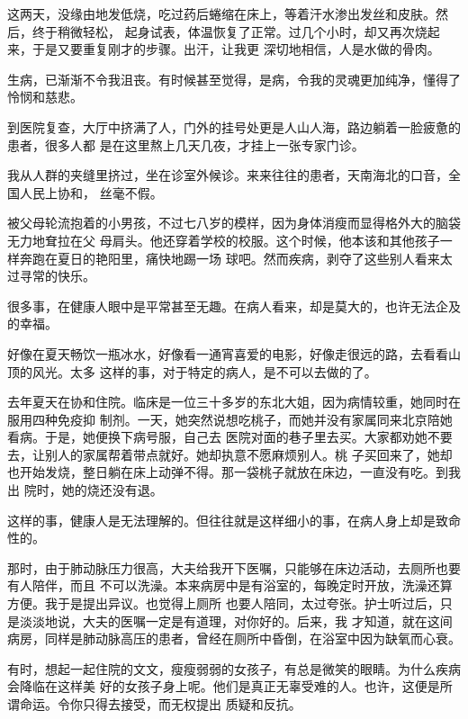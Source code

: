 		这两天，没缘由地发低烧，吃过药后蜷缩在床上，等着汗水渗出发丝和皮肤。然后，终于稍微轻松，
	起身试表，体温恢复了正常。过几个小时，却又再次烧起来，于是又要重复刚才的步骤。出汗，让我更
	深切地相信，人是水做的骨肉。

		生病，已渐渐不令我沮丧。有时候甚至觉得，是病，令我的灵魂更加纯净，懂得了怜悯和慈悲。

	\endwriting



		到医院复查，大厅中挤满了人，门外的挂号处更是人山人海，路边躺着一脸疲惫的患者，很多人都
	是在这里熬上几天几夜，才挂上一张专家门诊。

		我从人群的夹缝里挤过，坐在诊室外候诊。来来往往的患者，天南海北的口音，全国人民上协和，
	丝毫不假。

		被父母轮流抱着的小男孩，不过七八岁的模样，因为身体消瘦而显得格外大的脑袋无力地耷拉在父
	母肩头。他还穿着学校的校服。这个时候，他本该和其他孩子一样奔跑在夏日的艳阳里，痛快地踢一场
	球吧。然而疾病，剥夺了这些别人看来太过寻常的快乐。

		很多事，在健康人眼中是平常甚至无趣。在病人看来，却是莫大的，也许无法企及的幸福。

		好像在夏天畅饮一瓶冰水，好像看一通宵喜爱的电影，好像走很远的路，去看看山顶的风光。太多
	这样的事，对于特定的病人，是不可以去做的了。

		去年夏天在协和住院。临床是一位三十多岁的东北大姐，因为病情较重，她同时在服用四种免疫抑
	制剂。一天，她突然说想吃桃子，而她并没有家属同来北京陪她看病。于是，她便换下病号服，自己去
	医院对面的巷子里去买。大家都劝她不要去，让别人的家属帮着带点就好。她却执意不愿麻烦别人。桃
	子买回来了，她却也开始发烧，整日躺在床上动弹不得。那一袋桃子就放在床边，一直没有吃。到我出
	院时，她的烧还没有退。

		这样的事，健康人是无法理解的。但往往就是这样细小的事，在病人身上却是致命性的。

		那时，由于肺动脉压力很高，大夫给我开下医嘱，只能够在床边活动，去厕所也要有人陪伴，而且
	不可以洗澡。本来病房中是有浴室的，每晚定时开放，洗澡还算方便。我于是提出异议。也觉得上厕所
	也要人陪同，太过夸张。护士听过后，只是淡淡地说，大夫的医嘱一定是有道理，对你好的。后来，我
	才知道，就在这间病房，同样是肺动脉高压的患者，曾经在厕所中昏倒，在浴室中因为缺氧而心衰。

		有时，想起一起住院的文文，瘦瘦弱弱的女孩子，有总是微笑的眼睛。为什么疾病会降临在这样美
	好的女孩子身上呢。他们是真正无辜受难的人。也许，这便是所谓命运。令你只得去接受，而无权提出
	质疑和反抗。

